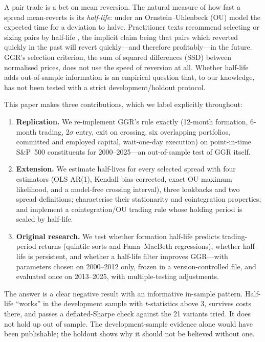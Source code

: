\documentclass[11pt]{article}
\begin{document}
A pair trade is a bet on mean reversion. The natural measure of how fast a spread mean-reverts is its \emph{half-life}: under an Ornstein--Uhlenbeck (OU) model the expected time for a deviation to halve. Practitioner texts recommend selecting or sizing pairs by half-life \citep{vidyamurthy2004,chan2013}, the implicit claim being that pairs which reverted quickly in the past will revert quickly---and therefore profitably---in the future. GGR's selection criterion, the sum of squared differences (SSD) between normalised prices, does not use the speed of reversion at all. Whether half-life adds out-of-sample information is an empirical question that, to our knowledge, has not been tested with a strict development/holdout protocol.

This paper makes three contributions, which we label explicitly throughout:
\begin{enumerate}
\item \textbf{Replication.} We re-implement GGR's rule exactly (12-month formation, 6-month trading, 2$\sigma$ entry, exit on crossing, six overlapping portfolios, committed and employed capital, wait-one-day execution) on point-in-time S\&P~500 constituents for 2000--2025---an out-of-sample test of GGR itself.
\item \textbf{Extension.} We estimate half-lives for every selected spread with four estimators (OLS AR(1), Kendall bias-corrected, exact OU maximum likelihood, and a model-free crossing interval), three lookbacks and two spread definitions; characterise their stationarity and cointegration properties; and implement a cointegration/OU trading rule whose holding period is scaled by half-life.
\item \textbf{Original research.} We test whether formation half-life predicts trading-period returns (quintile sorts and Fama--MacBeth regressions), whether half-life is persistent, and whether a half-life filter improves GGR---with parameters chosen on 2000--2012 only, frozen in a version-controlled file, and evaluated once on 2013--2025, with multiple-testing adjustments.
\end{enumerate}

The answer is a clear negative result with an informative in-sample pattern. Half-life ``works'' in the development sample with $t$-statistics above 3, survives costs there, and passes a deflated-Sharpe check against the 21 variants tried. It does not hold up out of sample. The development-sample evidence alone would have been publishable; the holdout shows why it should not be believed without one.
\end{document}
